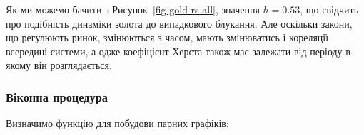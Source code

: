 \documentclass[
  letterpaper,
]{report}
\begin{document}
Як ми можемо бачити з Рисунок~\ref{fig-gold-rs-all}, значення
\(h=0.53\), що свідчить про подібність динаміки золота до випадкового
блукання. Але оскільки закони, що регулюють ринок, змінюються з часом,
мають змінюватись і кореляції всередині системи, а одже коефіцієнт
Херста також має залежати від періоду в якому він розглядається.

\hypertarget{ux432ux456ux43aux43eux43dux43dux430-ux43fux440ux43eux446ux435ux434ux443ux440ux430-1}{%
\subsubsection{Віконна
процедура}\label{ux432ux456ux43aux43eux43dux43dux430-ux43fux440ux43eux446ux435ux434ux443ux440ux430-1}}

Визначимо функцію для побудови парних графіків:
\end{document}
